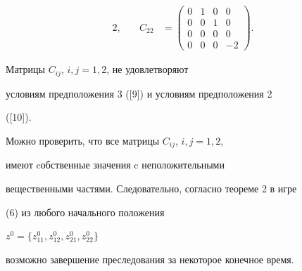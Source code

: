 \begin{examnonum}
\begin{alignat*}{2}
, &\quad 


C_{22} &= 


\begin{pmatrix}


0 & 1 & 0 & 0 \\


0 & 0 & 1 & 0 \\


0 & 0 & 0 & 0 \\


0 & 0 & 0 & -2


\end{pmatrix}


.


\end{alignat*}


Матрицы $C_{ij}$, $i,j = 1,2$, не удовлетворяют


условиям предположения 3 ([9]) и условиям предположения 2 


([10]).





Можно проверить, что все матрицы $C_{ij}$, $i,j = 1,2$,


имеют cобственные значения c неположительными


вещественными частями. Следовательно, согласно теореме 2 в игре


(6) из любого начального положения


$z^0= \{ z_{11}^0, z_{12}^0, z_{21}^0, z_{22}^0\} $


возможно завершение преследования за некоторое конечное время.


\end{examnonum}





